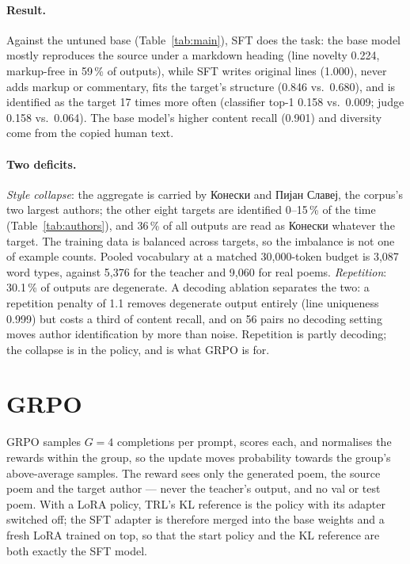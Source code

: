 \documentclass[11pt]{article}
\begin{document}
\paragraph{Result.} Against the untuned base (Table~\ref{tab:main}), SFT
does the task: the base model mostly reproduces the source under a markdown
heading (line novelty 0.224, markup-free in 59\,\% of outputs), while SFT
writes original lines (1.000), never adds markup or commentary, fits the
target's structure (0.846 vs.\ 0.680), and is identified as the target 17
times more often (classifier top-1 0.158 vs.\ 0.009; judge 0.158 vs.\ 0.064).
The base model's higher content recall (0.901) and diversity come from the
copied human text.

\paragraph{Two deficits.} \emph{Style collapse}: the aggregate is carried by
Конески and Пијан Славеј, the corpus's two largest authors; the other eight
targets are identified 0--15\,\% of the time (Table~\ref{tab:authors}), and
36\,\% of all outputs are read as Конески whatever the target. The training
data is balanced across targets, so the imbalance is not one of example
counts. Pooled vocabulary at a matched 30{,}000-token budget is 3{,}087 word
types, against 5{,}376 for the teacher and 9{,}060 for real poems.
\emph{Repetition}: 30.1\,\% of outputs are degenerate. A decoding ablation
separates the two: a repetition penalty of 1.1 removes degenerate output
entirely (line uniqueness 0.999) but costs a third of content recall, and on
56 pairs no decoding setting moves author identification by more than noise.
Repetition is partly decoding; the collapse is in the policy, and is what GRPO
is for.

\section{GRPO}\label{sec:grpo}

GRPO samples $G=4$ completions per prompt, scores each, and normalises the
rewards within the group, so the update moves probability towards the
group's above-average samples. The reward sees only the generated poem, the
source poem and the target author --- never the teacher's output, and no val
or test poem. With a LoRA policy, TRL's KL reference is the policy with its
adapter switched off; the SFT adapter is therefore merged into the base
weights and a fresh LoRA trained on top, so that the start policy and the KL
reference are both exactly the SFT model.
\end{document}
